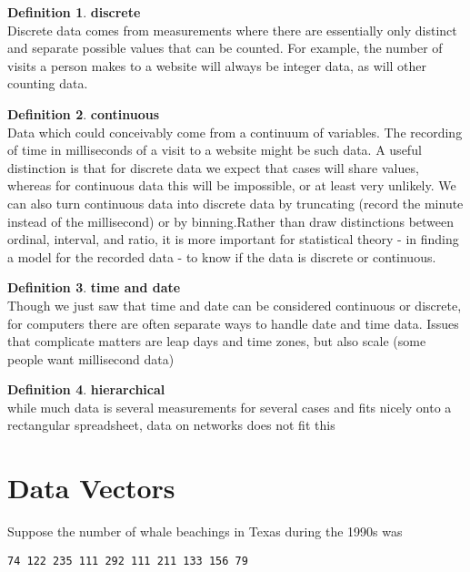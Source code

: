 \documentclass[
]{book}
\theoremstyle{definition}
\newtheorem{definition}{Definition}[chapter]
\theoremstyle{definition}
\theoremstyle{definition}
\theoremstyle{definition}
\theoremstyle{remark}
\begin{document}
\begin{definition}
\textbf{discrete}\\
Discrete data comes from measurements where there are essentially only distinct and separate possible values that can be counted. For example, the number of visits a person makes to a website will always be integer data, as will other counting data.
\end{definition}

\begin{definition}
\textbf{continuous}\\
Data which could conceivably come from a continuum of variables. The recording of time in milliseconds of a visit to a website might be such data. A useful distinction is that for discrete data we expect that cases will share values, whereas for continuous data this will be impossible, or at least very unlikely. We can also turn continuous data into discrete data by truncating (record the minute instead of the millisecond) or by binning.Rather than draw distinctions between ordinal, interval, and ratio, it is more important for statistical theory - in finding a model for the recorded data - to know if the data is discrete or continuous.
\end{definition}

\begin{definition}
\textbf{time and date}\\
Though we just saw that time and date can be considered continuous or discrete, for computers there are often separate ways to handle date and time data. Issues that complicate matters are leap days and time zones, but also scale (some people want millisecond data)
\end{definition}

\begin{definition}
\textbf{hierarchical}\\
while much data is several measurements for several cases and fits nicely onto a rectangular spreadsheet, data on networks does not fit this
\end{definition}

\hypertarget{data-vectors}{%
\section{Data Vectors}\label{data-vectors}}

Suppose the number of whale beachings in Texas during the 1990s was

\texttt{74\ 122\ 235\ 111\ 292\ 111\ 211\ 133\ 156\ 79}
\end{document}

